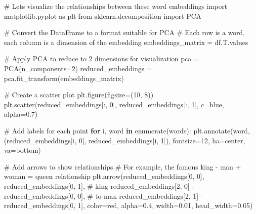 \documentclass[
  letterpaper,
  DIV=11,
  numbers=noendperiod]{scrartcl}
\newenvironment{Shaded}{\begin{snugshade}}{\end{snugshade}}
\newcommand{\BuiltInTok}[1]{\textcolor[rgb]{0.00,0.23,0.31}{#1}}
\newcommand{\CommentTok}[1]{\textcolor[rgb]{0.37,0.37,0.37}{#1}}
\newcommand{\ControlFlowTok}[1]{\textcolor[rgb]{0.00,0.23,0.31}{\textbf{#1}}}
\newcommand{\DecValTok}[1]{\textcolor[rgb]{0.68,0.00,0.00}{#1}}
\newcommand{\FloatTok}[1]{\textcolor[rgb]{0.68,0.00,0.00}{#1}}
\newcommand{\ImportTok}[1]{\textcolor[rgb]{0.00,0.46,0.62}{#1}}
\newcommand{\KeywordTok}[1]{\textcolor[rgb]{0.00,0.23,0.31}{\textbf{#1}}}
\newcommand{\NormalTok}[1]{\textcolor[rgb]{0.00,0.23,0.31}{#1}}
\newcommand{\OperatorTok}[1]{\textcolor[rgb]{0.37,0.37,0.37}{#1}}
\newcommand{\StringTok}[1]{\textcolor[rgb]{0.13,0.47,0.30}{#1}}
\begin{document}
\begin{Shaded}
\begin{Highlighting}[]
\CommentTok{\# Let\textquotesingle{}s visualize the relationships between these word embeddings}
\ImportTok{import}\NormalTok{ matplotlib.pyplot }\ImportTok{as}\NormalTok{ plt}
\ImportTok{from}\NormalTok{ sklearn.decomposition }\ImportTok{import}\NormalTok{ PCA}

\CommentTok{\# Convert the DataFrame to a format suitable for PCA}
\CommentTok{\# Each row is a word, each column is a dimension of the embedding}
\NormalTok{embeddings\_matrix }\OperatorTok{=}\NormalTok{ df.T.values}

\CommentTok{\# Apply PCA to reduce to 2 dimensions for visualization}
\NormalTok{pca }\OperatorTok{=}\NormalTok{ PCA(n\_components}\OperatorTok{=}\DecValTok{2}\NormalTok{)}
\NormalTok{reduced\_embeddings }\OperatorTok{=}\NormalTok{ pca.fit\_transform(embeddings\_matrix)}

\CommentTok{\# Create a scatter plot}
\NormalTok{plt.figure(figsize}\OperatorTok{=}\NormalTok{(}\DecValTok{10}\NormalTok{, }\DecValTok{8}\NormalTok{))}
\NormalTok{plt.scatter(reduced\_embeddings[:, }\DecValTok{0}\NormalTok{], reduced\_embeddings[:, }\DecValTok{1}\NormalTok{], c}\OperatorTok{=}\StringTok{\textquotesingle{}blue\textquotesingle{}}\NormalTok{, alpha}\OperatorTok{=}\FloatTok{0.7}\NormalTok{)}

\CommentTok{\# Add labels for each point}
\ControlFlowTok{for}\NormalTok{ i, word }\KeywordTok{in} \BuiltInTok{enumerate}\NormalTok{(words):}
\NormalTok{    plt.annotate(word, (reduced\_embeddings[i, }\DecValTok{0}\NormalTok{], reduced\_embeddings[i, }\DecValTok{1}\NormalTok{]), }
\NormalTok{                 fontsize}\OperatorTok{=}\DecValTok{12}\NormalTok{, ha}\OperatorTok{=}\StringTok{\textquotesingle{}center\textquotesingle{}}\NormalTok{, va}\OperatorTok{=}\StringTok{\textquotesingle{}bottom\textquotesingle{}}\NormalTok{)}

\CommentTok{\# Add arrows to show relationships}
\CommentTok{\# For example, the famous king {-} man + woman = queen relationship}
\NormalTok{plt.arrow(reduced\_embeddings[}\DecValTok{0}\NormalTok{, }\DecValTok{0}\NormalTok{], reduced\_embeddings[}\DecValTok{0}\NormalTok{, }\DecValTok{1}\NormalTok{],  }\CommentTok{\# king}
\NormalTok{          reduced\_embeddings[}\DecValTok{2}\NormalTok{, }\DecValTok{0}\NormalTok{] }\OperatorTok{{-}}\NormalTok{ reduced\_embeddings[}\DecValTok{0}\NormalTok{, }\DecValTok{0}\NormalTok{],  }\CommentTok{\# to man}
\NormalTok{          reduced\_embeddings[}\DecValTok{2}\NormalTok{, }\DecValTok{1}\NormalTok{] }\OperatorTok{{-}}\NormalTok{ reduced\_embeddings[}\DecValTok{0}\NormalTok{, }\DecValTok{1}\NormalTok{],}
\NormalTok{          color}\OperatorTok{=}\StringTok{\textquotesingle{}red\textquotesingle{}}\NormalTok{, alpha}\OperatorTok{=}\FloatTok{0.4}\NormalTok{, width}\OperatorTok{=}\FloatTok{0.01}\NormalTok{, head\_width}\OperatorTok{=}\FloatTok{0.05}\NormalTok{)}


\end{Highlighting}
\end{Shaded}
\end{document}
